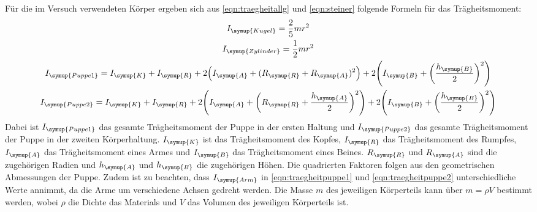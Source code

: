 Für die im Versuch verwendeten Körper ergeben sich aus \eqref{eqn:traegheitallg}
und \eqref{eqn:steiner} folgende Formeln für das Trägheitsmoment:
\begin{gather}
  I_{\symup{Kugel}}=\frac{2}{5}mr^2
  \label{eqn:traegheitkugel} \\
  I_{\symup{Zylinder}}=\frac{1}{2}mr^2
  \label{eqn:traegheitzylinder} \\
  \begin{split}
    I_{\symup{Puppe1}}=I_{\symup{K}}+I_{\symup{R}}
    +2\Bigl(I_{\symup{A}}+(R_{\symup{R}}+R_{\symup{A}})^2\Bigr)
    +2\Biggl(I_{\symup{B}}+\biggl(\frac{h_{\symup{B}}}{2}\biggr)^2\Biggr)
    \label{eqn:traegheitpuppe1}
  \end{split}
  \\
  \begin{split}
    I_{\symup{Puppe2}}=I_{\symup{K}}+I_{\symup{R}}
    +2\Biggl(I_{\symup{A}}+\biggl(R_{\symup{R}}+\frac{h_{\symup{A}}}{2}\biggr)^2\Biggr)
    +2\Biggl(I_{\symup{B}}+\biggl(\frac{h_{\symup{B}}}{2}\biggr)^2\Biggr)
    \label{eqn:traegheitpuppe2}
  \end{split}
\end{gather}
Dabei ist $I_{\symup{Puppe1}}$ das gesamte Trägheitsmoment der Puppe in der ersten
Haltung und $I_{\symup{Puppe2}}$ das gesamte Trägheitsmoment der Puppe in der
zweiten Körperhaltung. $I_{\symup{K}}$ ist das Trägheitsmoment des Kopfes, $I_{\symup{R}}$
das Trägheitsmoment des Rumpfes, $I_{\symup{A}}$ das Trägheitsmoment eines Armes und
$I_{\symup{B}}$ das Trägheitsmoment eines Beines. $R_{\symup{R}}$ und $R_{\symup{A}}$ sind die zugehörigen
Radien und $h_{\symup{A}}$ und $h_{\symup{B}}$ die zugehörigen Höhen. Die quadrierten Faktoren folgen
aus den geometrischen Abmessungen der Puppe. Zudem ist zu beachten, dass $I_{\symup{Arm}}$
in \eqref{eqn:traegheitpuppe1} und \eqref{eqn:traegheitpuppe2} unterschiedliche Werte
annimmt, da die Arme um verschiedene Achsen gedreht werden. Die Masse $m$ des jeweiligen
Körperteils kann über $m=\rho V$ bestimmt werden, wobei $\rho$ die Dichte das Materials und
$V$ das Volumen des jeweiligen Körperteils ist. 
